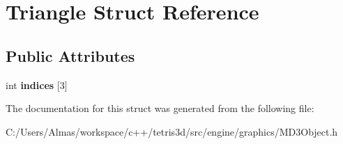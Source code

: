 \hypertarget{struct_triangle}{\section{Triangle Struct Reference}
\label{struct_triangle}
}
\subsection*{Public Attributes}
\begin{DoxyCompactItemize}
\item 
\hypertarget{struct_triangle_a60133115d2c12abba077fd00ebef015a}{int {\bfseries indices} \mbox{[}3\mbox{]}}\label{struct_triangle_a60133115d2c12abba077fd00ebef015a}

\end{DoxyCompactItemize}


The documentation for this struct was generated from the following file\-:\begin{DoxyCompactItemize}
\item 
C\-:/\-Users/\-Almas/workspace/c++/tetris3d/src/engine/graphics/M\-D3\-Object.\-h\end{DoxyCompactItemize}
